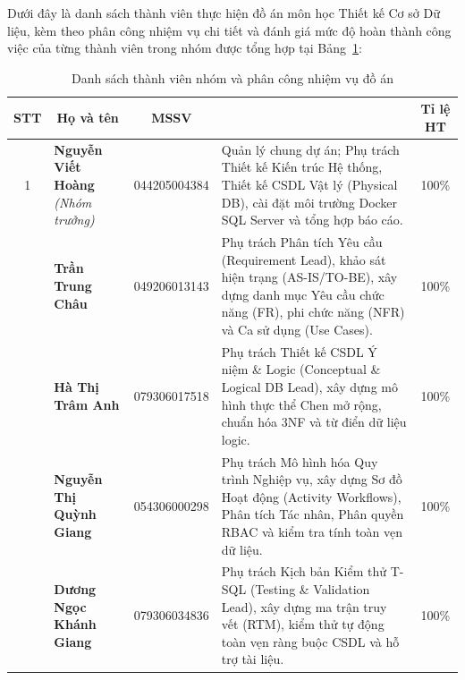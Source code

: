 
Dưới đây là danh sách thành viên thực hiện đồ án môn học Thiết kế Cơ sở Dữ liệu, kèm theo phân công nhiệm vụ chi tiết và đánh giá mức độ hoàn thành công việc của từng thành viên trong nhóm được tổng hợp tại Bảng~\ref{tab:team_members_contributions}:

\begin{table}[!ht]
\centering
\caption{Danh sách thành viên nhóm và phân công nhiệm vụ đồ án}
\label{tab:team_members_contributions}
\small
\renewcommand{\arraystretch}{1.35}
\begin{tabularx}{\textwidth}{cp{3.0cm}c>{\raggedright\arraybackslash}Xc}
\toprule
\textbf{STT} & \multicolumn{1}{c}{\textbf{Họ và tên}} & \textbf{MSSV} & \multicolumn{1}{c}{\textbf{Nhiệm vụ phân công}} & \textbf{Tỉ lệ HT} \\
\midrule
1 & \textbf{Nguyễn Viết Hoàng} \newline \textit{(Nhóm trưởng)} & 044205004384 & Quản lý chung dự án; Phụ trách Thiết kế Kiến trúc Hệ thống, Thiết kế CSDL Vật lý (Physical DB), cài đặt môi trường Docker SQL Server và tổng hợp báo cáo. & 100\% \\
\addlinespace
2 & \textbf{Trần Trung Châu} & 049206013143 & Phụ trách Phân tích Yêu cầu (Requirement Lead), khảo sát hiện trạng (AS-IS/TO-BE), xây dựng danh mục Yêu cầu chức năng (FR), phi chức năng (NFR) và Ca sử dụng (Use Cases). & 100\% \\
\addlinespace
3 & \textbf{Hà Thị Trâm Anh} & 079306017518 & Phụ trách Thiết kế CSDL Ý niệm \& Logic (Conceptual \& Logical DB Lead), xây dựng mô hình thực thể Chen mở rộng, chuẩn hóa 3NF và từ điển dữ liệu logic. & 100\% \\
\addlinespace
4 & \textbf{Nguyễn Thị Quỳnh Giang} & 054306000298 & Phụ trách Mô hình hóa Quy trình Nghiệp vụ, xây dựng Sơ đồ Hoạt động (Activity Workflows), Phân tích Tác nhân, Phân quyền RBAC và kiểm tra tính toàn vẹn dữ liệu. & 100\% \\
\addlinespace
5 & \textbf{Dương Ngọc Khánh Giang} & 079306034836 & Phụ trách Kịch bản Kiểm thử T-SQL (Testing \& Validation Lead), xây dựng ma trận truy vết (RTM), kiểm thử tự động toàn vẹn ràng buộc CSDL và hỗ trợ tài liệu. & 100\% \\
\bottomrule
\end{tabularx}
\end{table}

